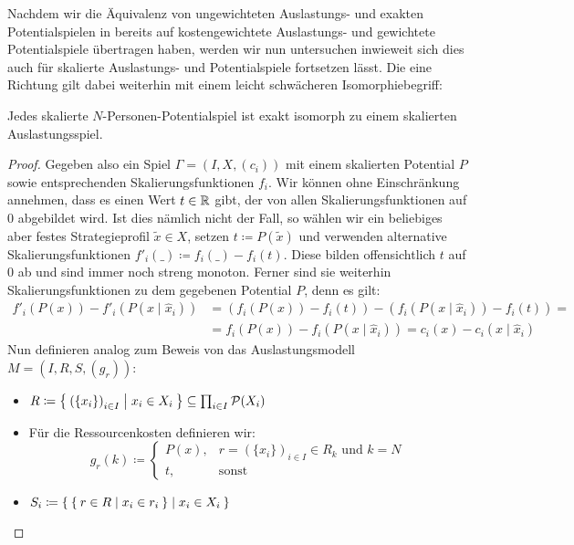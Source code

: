 Nachdem wir die Äquivalenz von ungewichteten Auslastungs- und exakten Potentialspielen in  bereits auf kostengewichtete Auslastungs- und gewichtete Potentialspiele übertragen haben, werden wir nun untersuchen inwieweit sich dies auch für skalierte Auslastungs- und Potentialspiele fortsetzen lässt. Die eine Richtung gilt dabei weiterhin mit einem leicht schwächeren Isomorphiebegriff:

\begin{satz}\label{satz:skalPotZuSkalAusl}
	Jedes skalierte $N$-Personen-Potentialspiel ist exakt isomorph zu einem skalierten Auslastungsspiel.
\end{satz}

\begin{proof}
	Gegeben also ein Spiel $\Gamma = (I, X, (c_i))$ mit einem skalierten Potential $P$ sowie entsprechenden Skalierungsfunktionen $f_i$. Wir können ohne Einschränkung annehmen, dass es einen Wert $t \in \mathbb{R}$ gibt, der von allen Skalierungsfunktionen auf $0$ abgebildet wird. Ist dies nämlich nicht der Fall, so wählen wir ein beliebiges aber festes Strategieprofil $\widetilde{x} \in X$, setzen $t \coloneqq P(\widetilde{x})$ und verwenden alternative Skalierungsfunktionen $f'_i(\_) \coloneqq f_i(\_) - f_i(t)$. Diese bilden offensichtlich $t$ auf $0$ ab und sind immer noch streng monoton. Ferner sind sie weiterhin Skalierungsfunktionen zu dem gegebenen Potential $P$, denn es gilt:
		\begin{align*}
			f'_i(P(x)) - f'_i(P(x\mid \hat{x}_i)) 	&= \left(f_i(P(x)) - f_i(t)\right) - \left(f_i(P(x \mid \hat{x}_i)) - f_i(t)\right) = \\
													&= f_i(P(x)) - f_i(P(x\mid \hat{x}_i)) = c_i(x) - c_i(x \mid \hat{x}_i)
		\end{align*}
	Nun definieren analog zum Beweis von  das Auslastungsmodell $M = (I, R, S, (g_r))$:
	\begin{itemize}
		\item $R \coloneqq \Set{\left(\{x_i\}\right)_{i \in I} | x_i \in X_i } \subseteq \prod_{i \in I}\mathcal{P}(X_i)$
		\item Für die Ressourcenkosten definieren wir:
			\[g_r(k) \coloneqq 
				\begin{cases}
					P(x), 					&r = \left(\{x_i\}\right)_{i \in I} \in R_k 													\text{ und } k=N \\
					t,						&\text{sonst}
				\end{cases}\]
		\item $S_i \coloneqq \Set{ \Set{r \in R | x_i \in r_i} | x_i \in X_i }$

\end{itemize}
\end{proof}
